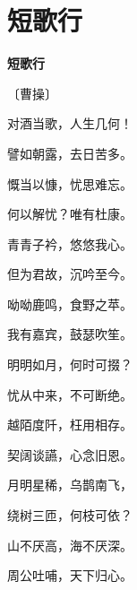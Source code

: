 \documentclass[12pt,UTF-8,openany,fontset=none]{ctexbook}
\begin{document}
\vspace{8pt}
\clearpage

\section{短歌行}


\begin{center}
    {\bfseries 短歌行}

    \vspace{18pt}

    \begin{large}\xuwen
        〔曹操〕
    \end{large}

\end{center}

    \vspace{12pt}

\begin{center}
    \begin{Large}

        对酒当歌，人生几何！

        譬如朝露，去日苦多。

        慨当以慷，忧思难忘。

        何以解忧？唯有杜康。

        \vspace{18pt}  %

        青青子衿，悠悠我心。

        但为君故，沉吟至今。

        呦呦鹿鸣，食野之苹。

        我有嘉宾，鼓瑟吹笙。

        \vspace{18pt}  %

        明明如月，何时可掇？

        忧从中来，不可断绝。

        越陌度阡，枉用相存。

        契阔谈讌，心念旧恩。

        \vspace{18pt}  %

        月明星稀，乌鹊南飞，

        绕树三匝，何枝可依？

        山不厌高，海不厌深。

        周公吐哺，天下归心。

    \end{Large}

\end{center}
\end{document}

